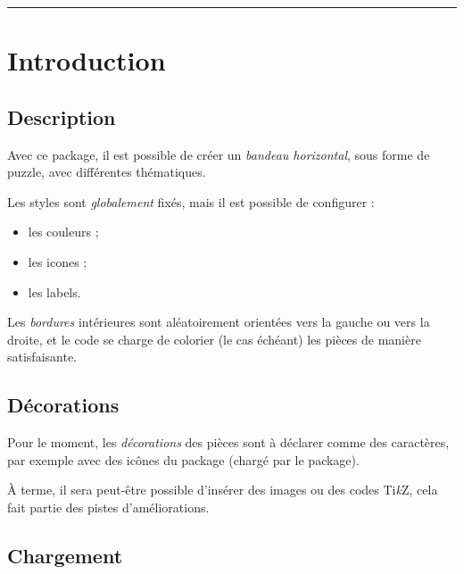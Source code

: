\documentclass[11pt,a4paper]{ltxdoc}
\providecommand\tikzlogo{Ti\textit{k}Z}
\let\TikZ\tikzlogo
\begin{document}
\vspace*{5mm}

\pagebreak


\hypertarget{matoc}{}

\tableofcontents

\vspace*{5mm}

\hrule

\vspace*{5mm}

\section{Introduction}

\subsection{Description}

Avec ce package, il est possible de créer un \textit{bandeau horizontal}, sous forme de puzzle, avec différentes thématiques.

Les styles sont \textit{globalement} fixés, mais il est possible de configurer :

\begin{itemize}
	\item les couleurs ;
	\item les icones ;
	\item les labels.
\end{itemize}

Les \textit{bordures} intérieures sont aléatoirement orientées vers la gauche ou vers la droite, et le code se charge de colorier (le cas échéant) les pièces de manière satisfaisante.

\subsection{Décorations}

Pour le moment, les \textit{décorations} des pièces sont à déclarer comme des caractères, par exemple avec des icônes du package  (chargé par le package).

\smallskip

À terme, il sera peut-être possible d'insérer des images ou des codes \TikZ, cela fait partie des pistes d'améliorations.

\subsection{Chargement}
\end{document}

